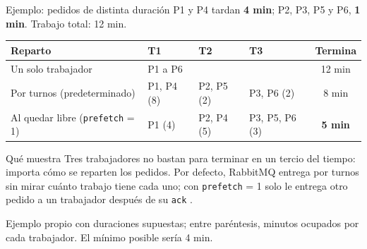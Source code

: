 \begin{frame}{Ejemplo: pedidos de distinta duración}
  \small
  P1 y P4 tardan \textbf{4 min}; P2, P3, P5 y P6, \textbf{1 min}.
  Trabajo total: 12 min.\\[0.2cm]

  \begin{tabularx}{\textwidth}{@{}p{3.7cm}XXXc@{}}
    \toprule
    \textbf{Reparto} & \textbf{T1} & \textbf{T2} & \textbf{T3} &
      \textbf{Termina} \\
    \midrule
    \raggedright Un solo trabajador & \multicolumn{3}{l}{P1 a P6} & 12 min \\
    \raggedright Por turnos (predeterminado) & P1, P4 (8) & P2, P5 (2) &
      P3, P6 (2) & 8 min \\
    \raggedright Al quedar libre (\texttt{prefetch} = 1) & P1 (4) &
      P2, P4 (5) & P3, P5, P6 (3) & \textbf{5 min} \\
    \bottomrule
  \end{tabularx}

  \vspace{0.3cm}
  \begin{block}{Qué muestra}
    Tres trabajadores no bastan para terminar en un tercio del tiempo: importa
    cómo se reparten los pedidos. Por defecto, RabbitMQ entrega por turnos sin
    mirar cuánto trabajo tiene cada uno; con \texttt{prefetch} = 1 solo le
    entrega otro pedido a un trabajador después de su \texttt{ack}
    \cite{rabbitmq2026workqueues}.
  \end{block}

  {\tiny Ejemplo propio con duraciones supuestas; entre paréntesis, minutos
  ocupados por cada trabajador. El mínimo posible sería 4 min.}
\end{frame}
